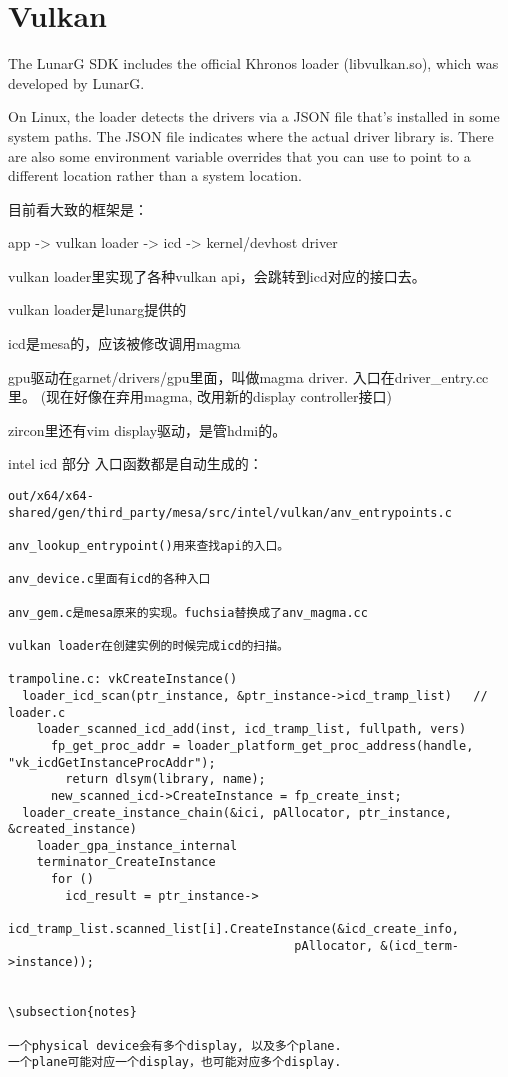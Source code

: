 \section{Vulkan}

The LunarG SDK includes the official Khronos loader (libvulkan.so), which was
developed by LunarG.

On Linux, the loader detects the drivers via a JSON file that’s installed in
some system paths. The JSON file indicates where the actual driver library is.
There are also some environment variable overrides that you can use to point to
a different location rather than a system location.

目前看大致的框架是：

app -> vulkan loader -> icd -> kernel/devhost driver

vulkan loader里实现了各种vulkan api，会跳转到icd对应的接口去。

vulkan loader是lunarg提供的

icd是mesa的，应该被修改调用magma

gpu驱动在garnet/drivers/gpu里面，叫做magma driver. 入口在driver_entry.cc里。
(现在好像在弃用magma, 改用新的display controller接口)

zircon里还有vim display驱动，是管hdmi的。

intel icd 部分
入口函数都是自动生成的：
\begin{verbatim}
out/x64/x64-shared/gen/third_party/mesa/src/intel/vulkan/anv_entrypoints.c

anv_lookup_entrypoint()用来查找api的入口。

anv_device.c里面有icd的各种入口

anv_gem.c是mesa原来的实现。fuchsia替换成了anv_magma.cc

vulkan loader在创建实例的时候完成icd的扫描。

trampoline.c: vkCreateInstance()
  loader_icd_scan(ptr_instance, &ptr_instance->icd_tramp_list)   // loader.c
    loader_scanned_icd_add(inst, icd_tramp_list, fullpath, vers)
      fp_get_proc_addr = loader_platform_get_proc_address(handle, "vk_icdGetInstanceProcAddr");
        return dlsym(library, name);
      new_scanned_icd->CreateInstance = fp_create_inst;
  loader_create_instance_chain(&ici, pAllocator, ptr_instance, &created_instance)
    loader_gpa_instance_internal
    terminator_CreateInstance
      for ()
        icd_result = ptr_instance->
            icd_tramp_list.scanned_list[i].CreateInstance(&icd_create_info, 
                                        pAllocator, &(icd_term->instance));


\subsection{notes}

一个physical device会有多个display, 以及多个plane.
一个plane可能对应一个display，也可能对应多个display.


\end{verbatim}